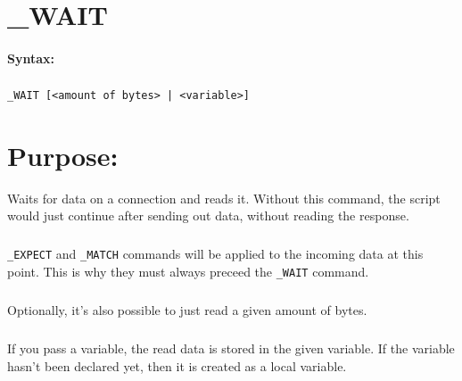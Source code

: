 
\newpage
\section{\_WAIT}
\label{cmd:_WAIT}

\paragraph{Syntax:}
\subparagraph{}
\texttt{\_WAIT [<amount of bytes> | <variable>]}

\section{Purpose:}
Waits for data on a connection and reads it. Without this 
command, the script would just continue after sending out 
data, without reading the response.

\subparagraph{}
\texttt{\_EXPECT} and \texttt{\_MATCH} commands will be 
applied to the incoming data at this point. This is why 
they must always preceed the \texttt{\_WAIT} command. 

\subparagraph{}
Optionally, it's also possible to just read a given amount 
of bytes.

\subparagraph{}
If you pass a variable, the read data is stored in the given
variable. If the variable hasn't been declared yet, then it
is created as a local variable.

